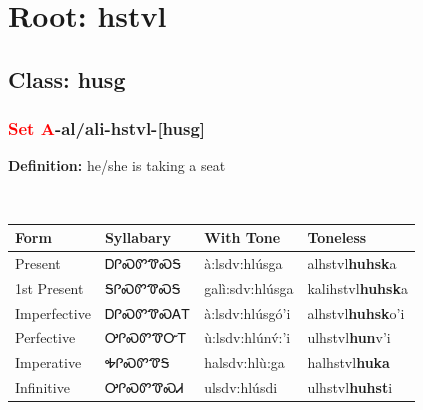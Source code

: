 \needspace{4in}
\section*{Root: hstvl}
\nopagebreak
{}
\needspace{3in}
\subsection*{Class: husg}
\nopagebreak
\needspace{2in}
\subsubsection*{\textcolor{Red}{Set A}{-}al/ali{-}\textbf{hstvl}{-}[husg]}
\nopagebreak
\textbf{Definition: } he/she is taking a seat
\\[0.5em]
\begin{tabularx}{\textwidth}{l X X X}%
\toprule%
\textbf{Form}&\textbf{Syllabary}&\textbf{With Tone}&\textbf{Toneless}\\%
\midrule%
Present&ᎠᎵᏍᏛᏡᏍᎦ&à:lsdv:hlúsga&alhstvl\textbf{huhsk}a\\%
1st Present&ᎦᎵᏍᏛᏡᏍᎦ&galì:sdv:hlúsga&kalihstvl\textbf{huhsk}a\\%
Imperfective&ᎠᎵᏍᏛᏡᏍᎪᎢ&à:lsdv:hlúsgó’i&alhstvl\textbf{huhsk}o'i\\%
Perfective&ᎤᎵᏍᏛᏡᏅᎢ&ù:lsdv:hlúnv́:’i&ulhstvl\textbf{hun}v'i\\%
Imperative&ᎭᎵᏍᏛᏡᎦ&halsdv:hlù:ga&halhstvl\textbf{huka}\\%
Infinitive&ᎤᎵᏍᏛᏡᏍᏗ&ulsdv:hlúsdi&ulhstvl\textbf{huhst}i\\%
\bottomrule%
\end{tabularx}
\\[1em]